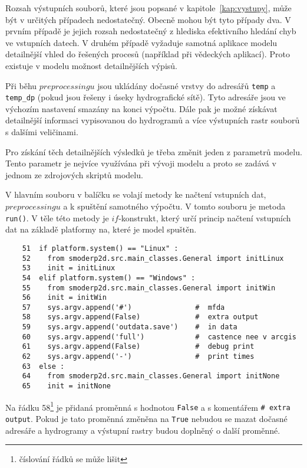 


Rozsah výstupních souborů, které jsou popsané v kapitole~\ref{kap:vystupy}, může být v určitých případech nedostatečný. Obecně mohou být tyto případy dva. V prvním případě je jejich rozsah nedostatečný z hlediska efektivního hledání chyb ve vstupních datech. V druhém případě vyžaduje samotná aplikace modelu  detailnější vhled do řešených procesů (například při vědeckých aplikací). Proto existuje v modelu \smod možnost detailnějších výpisů. 

Při běhu $preprocessingu$ jsou ukládány dočasné vrstvy do adresářů {\tt temp} a {\tt temp\_dp} (pokud jsou řešeny i úseky hydrografické sítě). Tyto adresáře jsou ve výchozím nastavení smazány na konci výpočtu. Dále pak je možné získávat detailnější informaci vypisovanou do hydrogramů a více výstupních rastr souborů s dalšími veličinami.

Pro získání těch detailnějších výsledků je třeba změnit jeden z parametrů modelu. Tento parametr je nejvíce využívána při vývoji modelu a proto se zadává v jednom ze zdrojových skriptů modelu. 

V hlavním souboru v balíčku  se volají metody ke načtení vstupních dat, $preprocessingu$ a k spuštění samotného výpočtu. V tomto souboru je metoda {\tt run()}. V těle této metody je $if$-konstrukt, který určí princip načtení vstupních dat na základě platformy na, které je model spuštěn. 

    \begin{lstlisting}
    51  if platform.system() == "Linux" :
    52    from smoderp2d.src.main_classes.General import initLinux
    53    init = initLinux
    54  elif platform.system() == "Windows" :
    55    from smoderp2d.src.main_classes.General import initWin
    56    init = initWin
    57    sys.argv.append('#')               #  mfda
    58    sys.argv.append(False)             #  extra output
    59    sys.argv.append('outdata.save')    #  in data
    60    sys.argv.append('full')            #  castence nee v arcgis
    61    sys.argv.append(False)             #  debug print
    62    sys.argv.append('-')               #  print times
    63  else :
    64    from smoderp2d.src.main_classes.General import initNone
    65    init = initNone
    \end{lstlisting}
    
Na řádku 58\footnote{číslování řádků se může lišit} je přidaná proměnná s hodnotou {\tt False} a s komentářem {\tt \#  extra output}. Pokud je tato proměnná změněna na {\tt True} nebudou se mazat dočasné adresáře a hydrogramy a výstupní rastry budou doplněný o další proměnné. 




    
    